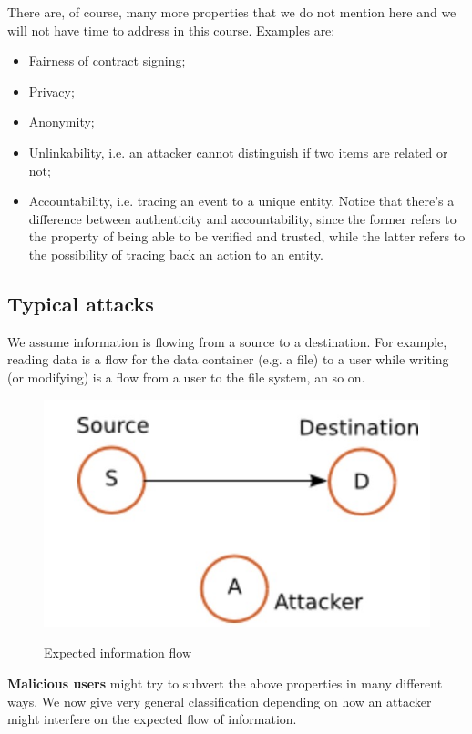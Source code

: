 There are, of course, many more properties that we do not mention here and we will not have time to address in this course. Examples are:

\begin{itemize}
    \item Fairness of contract signing;
    \item Privacy;
    \item Anonymity;
    \item Unlinkability, i.e. an attacker cannot distinguish if two items are related or not;
    \item Accountability, i.e. tracing an event to a unique entity. Notice that there's a difference between authenticity and accountability, since the former refers to the property of being able to be verified and trusted, while the latter refers to the possibility of tracing back an action to an entity.
\end{itemize}

\subsection{Typical attacks}
We assume information is flowing from a source to a destination. For example, reading data is a flow for the data container (e.g. a file) to a user while writing (or modifying) is a flow from a user to the file system, an so on.

\begin{figure}[h!]
    \centering
    \includegraphics[scale = 0.7]{img/sec1.jpg}
    \label{sec1}
    \caption{Expected information flow}
\end{figure}

\textbf{Malicious users} might try to subvert the above properties in many different ways. We now give very general classification depending on how an attacker might interfere on the expected flow of information.

